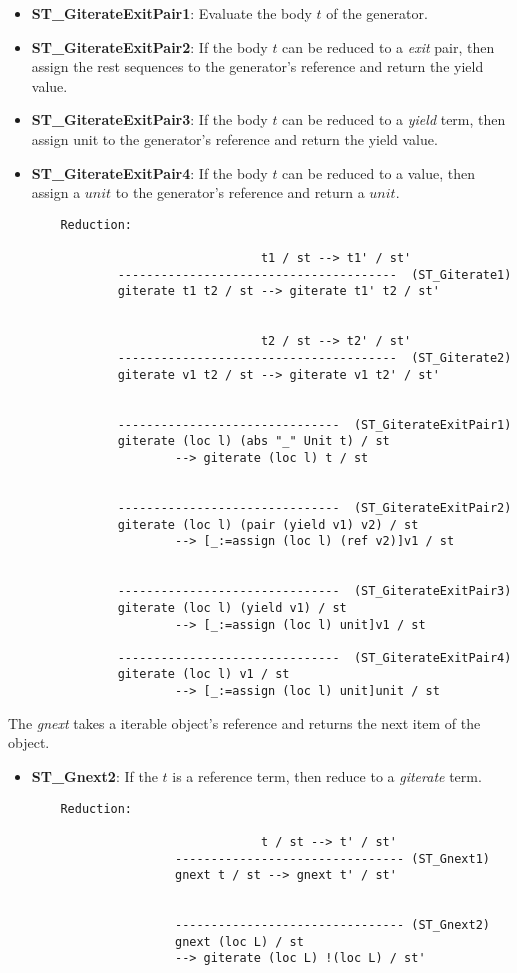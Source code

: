 \begin{itemize}
	\item 
	\textbf{ST_GiterateExitPair1}: Evaluate the body $t$ of the generator.
	\item
	\textbf{ST_GiterateExitPair2}: If the body $t$ can be reduced to a \textit{exit} pair, then assign the rest sequences to the generator's reference and return the yield value.
	\item
	\textbf{ST_GiterateExitPair3}: If the body $t$ can be reduced to a \textit{yield} term, then assign unit to the generator's reference and return the yield value.
	\item
	\textbf{ST_GiterateExitPair4}: If the body $t$ can be reduced to a value, then assign a $unit$ to the generator's reference and return a $unit$.
	\begin{lstlisting}
	Reduction:

								t1 / st --> t1' / st'
			---------------------------------------  (ST_Giterate1)
			giterate t1 t2 / st --> giterate t1' t2 / st'

							
								t2 / st --> t2' / st'
			---------------------------------------  (ST_Giterate2)
			giterate v1 t2 / st --> giterate v1 t2' / st'


			-------------------------------  (ST_GiterateExitPair1)
			giterate (loc l) (abs "_" Unit t) / st
					--> giterate (loc l) t / st


			-------------------------------  (ST_GiterateExitPair2)
			giterate (loc l) (pair (yield v1) v2) / st
					--> [_:=assign (loc l) (ref v2)]v1 / st

							
			-------------------------------  (ST_GiterateExitPair3)
			giterate (loc l) (yield v1) / st
					--> [_:=assign (loc l) unit]v1 / st
			
			-------------------------------  (ST_GiterateExitPair4)
			giterate (loc l) v1 / st 
					--> [_:=assign (loc l) unit]unit / st
	\end{lstlisting}
\end{itemize}

The \textit{gnext} takes a iterable object's reference and returns the next item of the object.
\begin{itemize}
	\item 
	\textbf{ST_Gnext2}: If the $t$ is a reference term, then reduce to a \textit{giterate} term.
	\begin{lstlisting}
	Reduction:

								t / st --> t' / st'
					-------------------------------- (ST_Gnext1)
					gnext t / st --> gnext t' / st'

					
					-------------------------------- (ST_Gnext2)
					gnext (loc L) / st 
					--> giterate (loc L) !(loc L) / st'
	\end{lstlisting}
\end{itemize}

